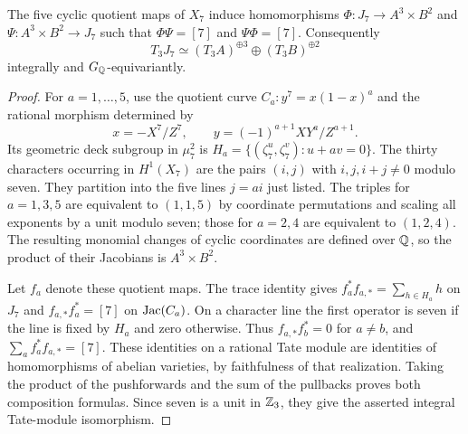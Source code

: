 \begin{lemma}\label{lem:septic-seven-isogeny}
The five cyclic quotient maps of $X_7$ induce homomorphisms
$\Phi:J_7\to A^3\times B^2$ and $\Psi:A^3\times B^2\to J_7$
such that $\Phi\Psi=[7]$ and $\Psi\Phi=[7]$. Consequently
\[
 T_3J_7\simeq(T_3A)^{\oplus3}\oplus(T_3B)^{\oplus2}
\]
integrally and $G_\mathbb Q$-equivariantly.
\end{lemma}
\begin{proof}
For $a=1,\ldots,5$, use the quotient curve
$C_a:y^7=x(1-x)^a$ and the rational morphism determined by
\[
 x=-X^7/Z^7,\qquad y=(-1)^{a+1}XY^a/Z^{a+1}.
\]
Its geometric deck subgroup in $\mu_7^2$ is
$H_a=\{(\zeta_7^u,\zeta_7^v):u+av=0\}$.
The thirty characters occurring in $H^1(X_7)$ are the pairs
$(i,j)$ with $i,j,i+j\ne0$ modulo seven. They partition into
the five lines $j=ai$ just listed. The triples for $a=1,3,5$
are equivalent to $(1,1,5)$ by coordinate permutations and
scaling all exponents by a unit modulo seven; those for
$a=2,4$ are equivalent to $(1,2,4)$. The resulting monomial
changes of cyclic coordinates are defined over $\mathbb Q$, so
the product of their Jacobians is $A^3\times B^2$.

Let $f_a$ denote these quotient maps. The trace identity gives
$f_a^*f_{a,*}=\sum_{h\in H_a}h$ on $J_7$ and
$f_{a,*}f_a^*=[7]$ on $\operatorname{Jac}(C_a)$. On a character line the
first operator is seven if the line is fixed by $H_a$ and
zero otherwise. Thus $f_{a,*}f_b^*=0$ for $a\ne b$, and
$\sum_a f_a^*f_{a,*}=[7]$. These identities on a rational
Tate module are identities of homomorphisms of abelian varieties,
by faithfulness of that realization. Taking the product of
the pushforwards and the sum of the pullbacks proves both
composition formulas. Since seven is a unit in $\mathbb Z_3$, they
give the asserted integral Tate-module isomorphism.
\end{proof}

